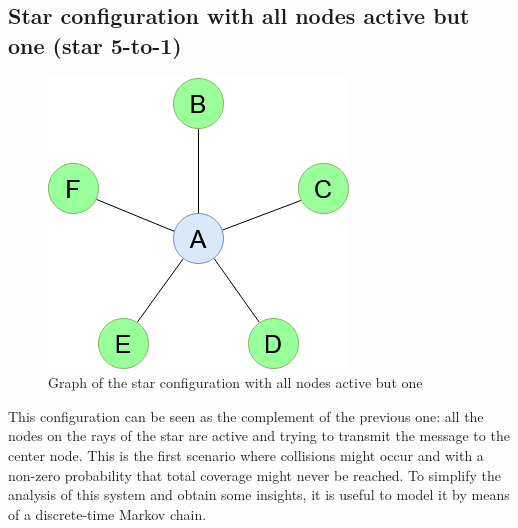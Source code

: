 \subsection{Star configuration with all nodes active but one (star 5-to-1)}
\label{ssec:star2}
\begin{figure}[H]
    \begin{center}
        \includegraphics[scale=0.4]{img/star_graph2.png}
        \caption{Graph of the star configuration with all nodes active but one}
        \label{fig:star5to1}
    \end{center}
\end{figure}
This configuration can be seen as the complement of the previous one: all the nodes
on the rays of the star are active and trying to transmit the message to the
center node. This is the first scenario where collisions might occur and with a non-zero probability that
total coverage might never be reached. To simplify the
analysis of this system and obtain some insights, it is useful to model it by
means of a discrete-time Markov chain.
